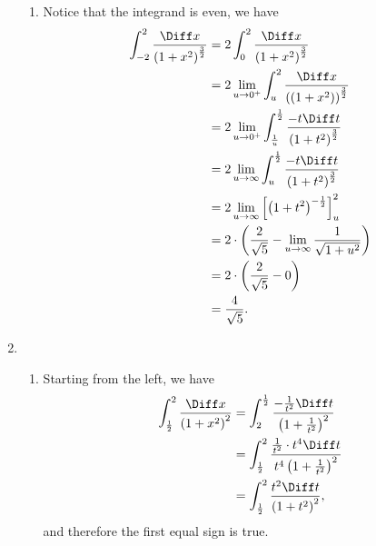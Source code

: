 \begin{enumerate}
\begin{enumerate}
              \item Notice that the integrand is even, we have
                    \begin{align*}
                        \int_{-2}^{2} \frac{\Diff x}{\left(1 + x^2\right)^{\frac{3}{2}}} & = 2 \int_{0}^{2} \frac{\Diff x}{\left(1 + x^2\right)^{\frac{3}{2}}}                                           \\
                                                                                         & = 2 \lim_{u \to 0^{+}} \int_{u}^{2} \frac{\Diff x}{\left((1 + x^2)\right)^{\frac{3}{2}}}                      \\
                                                                                         & = 2 \lim_{u \to 0^{+}} \int_{\frac{1}{u}}^{\frac{1}{2}} \frac{-t \Diff t}{\left(1 + t^2\right)^{\frac{3}{2}}} \\
                                                                                         & = 2 \lim_{u \to \infty} \int_{u}^{\frac{1}{2}} \frac{-t \Diff t}{\left(1 + t^2\right)^{\frac{3}{2}}}          \\
                                                                                         & = 2 \lim_{u \to \infty} \left[\left(1 + t^2\right)^{-\frac{1}{2}}\right]_{u}^{2}                              \\
                                                                                         & = 2 \cdot \left(\frac{2}{\sqrt{5}} - \lim_{u \to \infty} \frac{1}{\sqrt{1 + u^2}}\right)                      \\
                                                                                         & = 2 \cdot \left(\frac{2}{\sqrt{5}} - 0\right)                                                                 \\
                                                                                         & = \frac{4}{\sqrt{5}}.
                    \end{align*}
          \end{enumerate}

    \item \begin{enumerate}
              \item Starting from the left, we have
                    \begin{align*}
                        \int_{\frac{1}{2}}^{2} \frac{\Diff x}{\left(1 + x^2\right)^2} & = \int_{2}^{\frac{1}{2}} \frac{- \frac{1}{t^2} \Diff t}{\left(1 + \frac{1}{t^2}\right)^2}             \\
                                                                                      & = \int_{\frac{1}{2}}^{2} \frac{\frac{1}{t^2} \cdot t^4 \Diff t}{t^4 \left(1 + \frac{1}{t^2}\right)^2} \\
                                                                                      & = \int_{\frac{1}{2}}^{2} \frac{t^2 \Diff t}{\left(1 + t^2\right)^2},
                    \end{align*}
                    and therefore the first equal sign is true.


\end{enumerate}
\end{enumerate}

